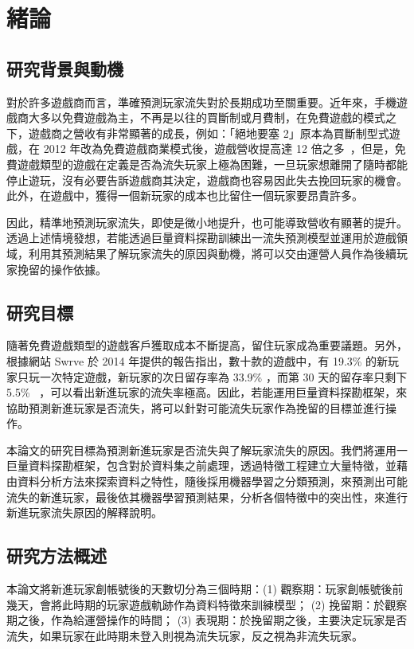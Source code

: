 \chapter{緒論}

\section{研究背景與動機}

對於許多遊戲商而言，準確預測玩家流失對於長期成功至關重要。近年來，手機遊戲商大多以免費遊戲為主，不再是以往的買斷制或月費制，在免費遊戲的模式之下，遊戲商之營收有非常顯著的成長，例如：「絕地要塞 2」原本為買斷制型式遊戲，在 2012 年改為免費遊戲商業模式後，遊戲營收提高達 12 倍之多~\cite{miller2012gdc}，但是，免費遊戲類型的遊戲在定義是否為流失玩家上極為困難，一旦玩家想離開了隨時都能停止遊玩，沒有必要告訴遊戲商其決定，遊戲商也容易因此失去挽回玩家的機會。此外，在遊戲中，獲得一個新玩家的成本也比留住一個玩家要昂貴許多。

因此，精準地預測玩家流失，即使是微小地提升，也可能導致營收有顯著的提升。透過上述情境發想，若能透過巨量資料探勘訓練出一流失預測模型並運用於遊戲領域，利用其預測結果了解玩家流失的原因與動機，將可以交由運營人員作為後續玩家挽留的操作依據。

\section{研究目標}

隨著免費遊戲類型的遊戲客戶獲取成本不斷提高，留住玩家成為重要議題。另外，根據網站 Swrve 於 2014 年提供的報告指出，數十款的遊戲中，有 19.3\% 的新玩家只玩一次特定遊戲，新玩家的次日留存率為 33.9\% ，而第 30 天的留存率只剩下 5.5\% ~\cite{SwrveNewPlayerReport}，可以看出新進玩家的流失率極高。因此，若能運用巨量資料探勘框架，來協助預測新進玩家是否流失，將可以針對可能流失玩家作為挽留的目標並進行操作。

本論文的研究目標為預測新進玩家是否流失與了解玩家流失的原因。我們將運用一巨量資料探勘框架，包含對於資料集之前處理，透過特徵工程建立大量特徵，並藉由資料分析方法來探索資料之特性，隨後採用機器學習之分類預測，來預測出可能流失的新進玩家，最後依其機器學習預測結果，分析各個特徵中的突出性，來進行新進玩家流失原因的解釋說明。

\section{研究方法概述}

本論文將新進玩家創帳號後的天數切分為三個時期：(1) 觀察期：玩家創帳號後前幾天，會將此時期的玩家遊戲軌跡作為資料特徵來訓練模型； (2) 挽留期：於觀察期之後，作為給運營操作的時間； (3) 表現期：於挽留期之後，主要決定玩家是否流失，如果玩家在此時期未登入則視為流失玩家，反之視為非流失玩家。

